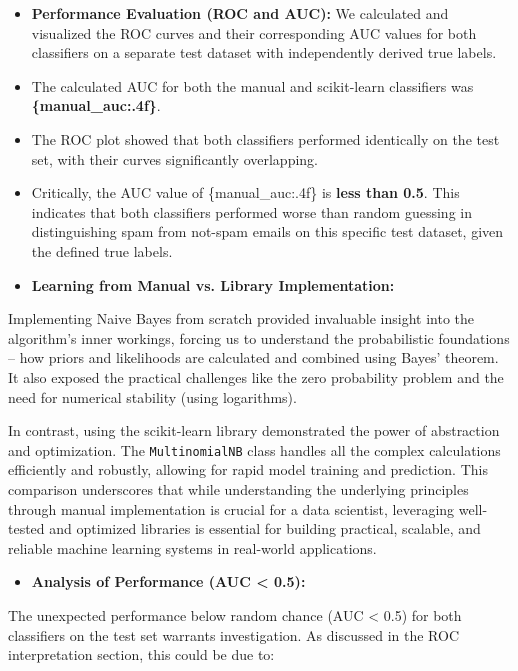\documentclass[12pt,a4paper]{article}
\begin{document}
\begin{itemize}
    \item \textbf{Performance Evaluation (ROC and AUC):} We calculated and visualized the ROC curves and their corresponding AUC values for both classifiers on a separate test dataset with independently derived true labels.
    \item The calculated AUC for both the manual and scikit-learn classifiers was \textbf{\{manual\_auc:.4f\}}.
    \item The ROC plot showed that both classifiers performed identically on the test set, with their curves significantly overlapping.
    \item Critically, the AUC value of \{manual\_auc:.4f\} is \textbf{less than 0.5}. This indicates that both classifiers performed worse than random guessing in distinguishing spam from not-spam emails on this specific test dataset, given the defined true labels.
    \item \textbf{Learning from Manual vs. Library Implementation:}
\end{itemize}

Implementing Naive Bayes from scratch provided invaluable insight into the algorithm's inner workings, forcing us to understand the probabilistic foundations – how priors and likelihoods are calculated and combined using Bayes' theorem. It also exposed the practical challenges like the zero probability problem and the need for numerical stability (using logarithms).

In contrast, using the scikit-learn library demonstrated the power of abstraction and optimization. The \texttt{MultinomialNB} class handles all the complex calculations efficiently and robustly, allowing for rapid model training and prediction. This comparison underscores that while understanding the underlying principles through manual implementation is crucial for a data scientist, leveraging well-tested and optimized libraries is essential for building practical, scalable, and reliable machine learning systems in real-world applications.

\begin{itemize}
    \item \textbf{Analysis of Performance (AUC < 0.5):}
\end{itemize}

The unexpected performance below random chance (AUC < 0.5) for both classifiers on the test set warrants investigation. As discussed in the ROC interpretation section, this could be due to:
\end{document}
